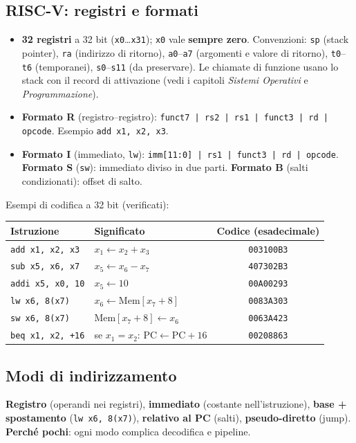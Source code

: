 \subsection{RISC-V: registri e formati}
\begin{itemize}
    \item \textbf{32 registri} a 32 bit (\texttt{x0}\ldots\texttt{x31}); \texttt{x0} vale \textbf{sempre zero}. Convenzioni: \texttt{sp} (stack pointer), \texttt{ra} (indirizzo di ritorno), \texttt{a0}--\texttt{a7} (argomenti e valore di ritorno), \texttt{t0}--\texttt{t6} (temporanei), \texttt{s0}--\texttt{s11} (da preservare). Le chiamate di funzione usano lo stack con il record di attivazione (vedi i capitoli \emph{Sistemi Operativi} e \emph{Programmazione}).
    \item \textbf{Formato R} (registro--registro): \texttt{funct7 | rs2 | rs1 | funct3 | rd | opcode}. Esempio \texttt{add x1, x2, x3}.
    \item \textbf{Formato I} (immediato, \texttt{lw}): \texttt{imm[11:0] | rs1 | funct3 | rd | opcode}. \textbf{Formato S} (\texttt{sw}): immediato diviso in due parti. \textbf{Formato B} (salti condizionati): offset di salto.
\end{itemize}
Esempi di codifica a 32 bit (verificati):
\begin{center}
\small
\begin{tabular}{@{}llc@{}}
\toprule
\textbf{Istruzione} & \textbf{Significato} & \textbf{Codice (esadecimale)} \\
\midrule
\texttt{add x1, x2, x3} & $x_1 \leftarrow x_2 + x_3$ & \texttt{003100B3} \\
\texttt{sub x5, x6, x7} & $x_5 \leftarrow x_6 - x_7$ & \texttt{407302B3} \\
\texttt{addi x5, x0, 10} & $x_5 \leftarrow 10$ & \texttt{00A00293} \\
\texttt{lw x6, 8(x7)} & $x_6 \leftarrow \text{Mem}[x_7 + 8]$ & \texttt{0083A303} \\
\texttt{sw x6, 8(x7)} & $\text{Mem}[x_7 + 8] \leftarrow x_6$ & \texttt{0063A423} \\
\texttt{beq x1, x2, +16} & se $x_1 = x_2$: $\text{PC} \leftarrow \text{PC} + 16$ & \texttt{00208863} \\
\bottomrule
\end{tabular}
\end{center}

\subsection{Modi di indirizzamento}
\textbf{Registro} (operandi nei registri), \textbf{immediato} (costante nell'istruzione), \textbf{base + spostamento} (\texttt{lw x6, 8(x7)}), \textbf{relativo al PC} (salti), \textbf{pseudo-diretto} (jump). \textbf{Perché pochi}: ogni modo complica decodifica e pipeline.

